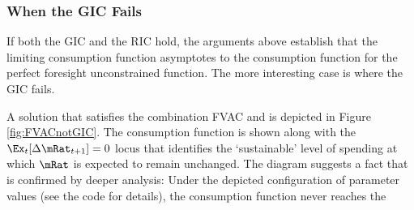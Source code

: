 \documentclass[titlepage]{\econtex}\providecommand{\texname}{BufferStockTheory}
\begin{document}
\hypertarget{The-GIC}{}
\hypertarget{When-the-GIC-Fails}{}
\subsubsection{When the GIC Fails}

If both the GIC and the RIC hold, the arguments above establish that the limiting consumption
function asymptotes to the consumption function for the perfect foresight unconstrained function.
The more interesting case is where the GIC fails.
\begin{comment}
\WW{}{The same
steps as above lead to the same implication that this requires
$\InvEpShkInv < (\Rfree/\PGro)^{1/\CRRA}\uInvEpShkuInv^{1-1/\CRRA}$,
but when the RIC $\Rfree/\PGro > 1$ holds this condition is much more
easily satisfied.}
If the FVAC holds but the GIC does not, the parameters must satisfy:
\begin{eqnarray}
\DiscFac \PGro^{1-\CRRA}\Ex[\pshk^{1-\CRRA}] & < 1 < & (\Rfree\DiscFac)^{1/\CRRA}(\PGro\Ex[\pshk^{-1}])^{-1}. \label{eq:FVACnotGIC}
\end{eqnarray}

Note first that by Jensens's inequality $\Ex[\pshk^{1-\CRRA}] > 1$ and $(\Ex[\pshk^{-1}])^{-1} < 1$,
so \eqref{eq:FVACnotGIC} is stronger than
\begin{eqnarray}
\DiscFac \PGro^{1-\CRRA} & < 1 < & (\Rfree\DiscFac)^{1/\CRRA}/\PGro. \label{eq:PFFVACnotPFGIC}
\end{eqnarray}


Suppose $\PGro=1$, $\CRRA=2$ and $\pshk$ is lognormally distributed with $\sigma^{2}_{\pshk}=0.01$ (that is, $\log \pshk \sim \mathcal{N}(-\sigma_{\psi}^{2}/2,\sigma_{\psi}^{2})$) so that $\Ex_{t}[\pshk_{t+1}^{1-\CRRA}] =\Ex_{t}[\pshk_{t+1}^{-1}] =\exp(\sigma^{2}_{\psi})=e^{0.01}.$  Then the condition becomes
\begin{eqnarray}
\DiscFac e^{0.01} & < 1 < & (\Rfree \DiscFac)^{1/2}e^{-0.01}
\end{eqnarray}
which can be satisfied, for example, by $\DiscFac = 0.96$ and $\Rfree=1.08$.
\end{comment}
A solution that satisfies the combination FVAC and
 is depicted in Figure \ref{fig:FVACnotGIC}.  The
consumption function is shown along with the $\Ex_{t}[\Delta
\mRat_{t+1}]=0$ locus that identifies the `sustainable' level of
spending at which $\mRat$ is expected to remain unchanged.  The
diagram suggests a fact that is confirmed by deeper analysis: Under
the depicted configuration of parameter values (see the code for details), the consumption function never reaches the
\end{document}
